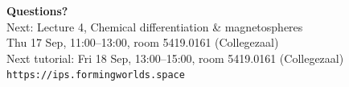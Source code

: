 \documentclass[aspectratio=169, 11pt]{beamer}
\begin{document}
\begin{frame}
  \vfill
  \begin{center}
    {\color{white}\LARGE\bfseries Questions?}\\[14pt]
    {\color{white!85}\large Next: Lecture 4, Chemical differentiation \& magnetospheres}\\[4pt]
    {\color{white!85}\small Thu 17 Sep, 11:00--13:00, room 5419.0161 (Collegezaal)}\\[12pt]
    {\color{white!85}\small Next tutorial: Fri 18 Sep, 13:00--15:00, room 5419.0161 (Collegezaal)}\\[20pt]
    {\color{white!70}\small \texttt{https://ips.formingworlds.space}}
  \end{center}
  \vfill
\end{frame}
\end{document}
